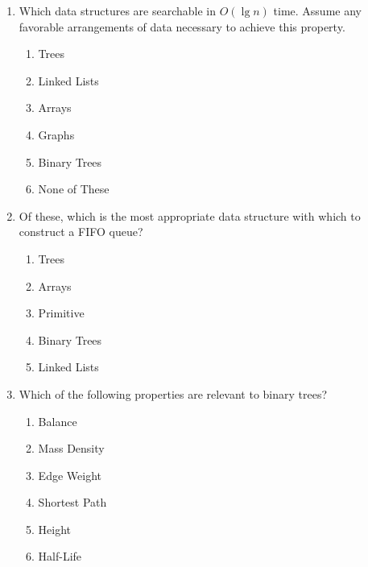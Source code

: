 \documentclass{letter}
\begin{document}
\begin{enumerate}[a]

\item Which data structures are searchable in $O(\lg n)$ time.  Assume any
favorable arrangements of data necessary to achieve this property.

\begin{enumerate}[i]

\item Trees
\item Linked Lists
\item Arrays
\item Graphs
\item Binary Trees
\item None of These

\end{enumerate}

\vspace{0.5cm}

\item Of these, which is the most appropriate data structure with which to
construct a FIFO queue?

\begin{enumerate}[i]

\item Trees
\item Arrays
\item Primitive
\item Binary Trees
\item Linked Lists

\end{enumerate}

\vspace{0.5cm}

\item Which of the following properties are relevant to binary trees?

\begin{enumerate}[i]

\item Balance
\item Mass Density
\item Edge Weight
\item Shortest Path
\item Height
\item Half-Life

\end{enumerate}

\vspace{0.5cm}


\end{enumerate}
\end{document}
